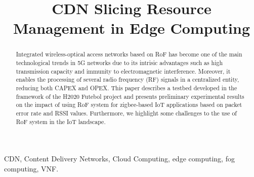 \documentclass[conference]{IEEEtran}
\begin{document}

	\title{CDN Slicing Resource Management in Edge Computing}

\author{
}

	\maketitle

	\begin{abstract}
	    Integrated wireless-optical access networks based on \ac{RoF} has become one of the main technological trends in \ac{5G} networks due to its intrisic advantages such as high transmission capacity and immunity to electromagnetic interference. Moreover, it enables the processing of several radio frequency (RF) signals in a centralized entity, reducing both \ac{CAPEX} and \ac{OPEX}. 
	    This paper describes a testbed developed in the framework of the H2020 Futebol project and presents preliminary experimental results on the impact of using \ac{RoF} system for zigbee-based \ac{IoT} applications based on packet error rate and \ac{RSSI} values.
	    Furthermore, we highlight some challenges to the use of \ac{RoF} system in the \ac{IoT} landscape.
	\end{abstract}

    \begin{IEEEkeywords}
    	CDN, Content Delivery Networks, Cloud Computing, edge computing, fog computing, VNF.
    \end{IEEEkeywords}

    \acresetall
    
    
    
    

    
    
    
    
    
    
    

	
	
	
\end{document}
